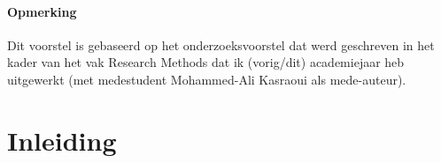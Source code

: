 

\paragraph{Opmerking}
Dit voorstel is gebaseerd op het onderzoeksvoorstel dat werd geschreven in het
kader van het vak Research Methods dat ik (vorig/dit) academiejaar heb
uitgewerkt (met medestudent Mohammed-Ali Kasraoui als mede-auteur).
 

\section{Inleiding}%
\label{sec:inleiding}


%



